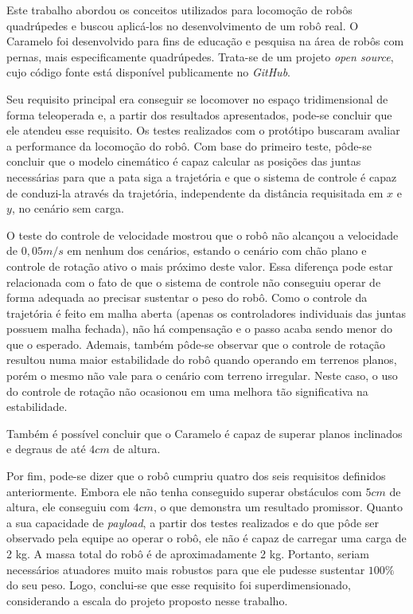 \documentclass[../main.tex]{subfiles}
\begin{document}
  Este trabalho abordou os conceitos utilizados para locomoção de robôs quadrúpedes e buscou aplicá-los no desenvolvimento de um robô real. O Caramelo foi desenvolvido para fins de educação e pesquisa na área de robôs com pernas, mais especificamente quadrúpedes. Trata-se de um projeto \textit{open source}, cujo código fonte está disponível publicamente no \textit{GitHub}. 
  
  Seu requisito principal era conseguir se locomover no espaço tridimensional de forma teleoperada e, a partir dos resultados apresentados, pode-se concluir que ele atendeu esse requisito. Os testes realizados com o protótipo buscaram avaliar a performance da locomoção do robô. Com base do primeiro teste, pôde-se concluir que o modelo cinemático é capaz calcular as posições das juntas necessárias para que a pata siga a trajetória e que o sistema de controle é capaz de conduzi-la através da trajetória, independente da distância requisitada em $x$ e $y$, no cenário sem carga. 
  
  O teste do controle de velocidade mostrou que o robô não alcançou a velocidade de $0,05 m/s$ em nenhum dos cenários, estando o cenário com chão plano e controle de rotação ativo o mais próximo deste valor. Essa diferença pode estar relacionada com o fato de que o sistema de controle não conseguiu operar de forma adequada ao precisar sustentar o peso do robô. Como o controle da trajetória é feito em malha aberta (apenas os controladores individuais das juntas possuem malha fechada), não há compensação e o passo acaba sendo menor do que o esperado. Ademais, também pôde-se observar que o controle de rotação resultou numa maior estabilidade do robô quando operando em terrenos planos, porém o mesmo não vale para o cenário com terreno irregular. Neste caso, o uso do controle de rotação não ocasionou em uma melhora tão significativa na estabilidade.
  
  Também é possível concluir que o Caramelo é capaz de superar planos inclinados e degraus de até $4cm$ de altura. 

  Por fim, pode-se dizer que o robô cumpriu quatro dos seis requisitos definidos anteriormente. Embora ele não tenha conseguido superar obstáculos com $5cm$ de altura, ele conseguiu com $4cm$, o que demonstra um resultado promissor. Quanto a sua capacidade de \textit{payload}, a partir dos testes realizados e do que pôde ser observado pela equipe ao operar o robô, ele não é capaz de carregar uma carga de 2 kg. A massa total do robô é de aproximadamente 2 kg. Portanto, seriam necessários atuadores muito mais robustos para que ele pudesse sustentar $100\%$ do seu peso. Logo, conclui-se que esse requisito foi superdimensionado, considerando a escala do projeto proposto nesse trabalho.
\end{document}
